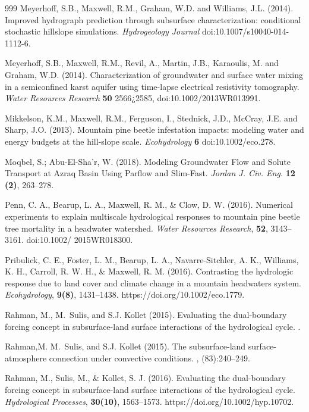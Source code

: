 \begin{thebibliography}{999}
Meyerhoff, S.B., Maxwell, R.M., Graham, W.D. and Williams, J.L. (2014). Improved hydrograph prediction through subsurface characterization: conditional stochastic hillslope simulations. {\em Hydrogeology Journal} doi:10.1007/s10040-014-1112-6.

Meyerhoff, S.B., Maxwell, R.M., Revil, A., Martin, J.B., Karaoulis, M. and Graham, W.D. (2014). Characterization of groundwater and surface water mixing in a semiconfined karst aquifer using time-lapse electrical resistivity tomography. {\em Water Resources Research} {\bf 50} 2566¿2585, doi:10.1002/2013WR013991.

Mikkelson, K.M., Maxwell, R.M., Ferguson, I., Stednick, J.D., McCray, J.E. and Sharp, J.O. (2013). Mountain pine beetle infestation impacts: modeling water and energy budgets at the hill-slope scale. {\em Ecohydrology} {\bf 6} doi:10.1002/eco.278.

Moqbel, S.; Abu-El-Sha’r, W. (2018). Modeling Groundwater Flow and Solute Transport at Azraq Basin Using Parflow and Slim-Fast. {\em Jordan J. Civ. Eng.} {\bf 12 (2)}, 263–278.

Penn, C. A., Bearup, L. A., Maxwell, R. M., \& Clow, D. W. (2016). Numerical experiments to explain multiscale hydrological responses to mountain pine beetle tree mortality in a headwater watershed. {\em Water Resources Research}, {\bf 52}, 3143–3161. doi:10.1002/ 2015WR018300.


Pribulick, C. E., Foster, L. M., Bearup, L. A., Navarre-Sitchler, A. K., Williams, K. H., Carroll, R. W. H., \& Maxwell, R. M. (2016). Contrasting the hydrologic response due to land cover and climate change in a mountain headwaters system. {\em Ecohydrology}, {\bf 9(8)}, 1431–1438. https://doi.org/10.1002/eco.1779.


Rahman, M., M.~Sulis, and S.J. Kollet (2015).
\newblock Evaluating the dual-boundary forcing concept in subsurface-land
  surface interactions of the hydrological cycle.
.

Rahman,M. M.~Sulis, and S.J. Kollet (2015).
\newblock The subsurface-land surface-atmosphere connection under convective
  conditions.
, (83):240--249.

Rahman, M., Sulis, M., \& Kollet, S. J. (2016). Evaluating the dual-boundary forcing concept in subsurface-land surface interactions of the hydrological cycle. {\em Hydrological Processes}, {\bf 30(10)}, 1563–1573. https://doi.org/10.1002/hyp.10702.



\end{thebibliography}

